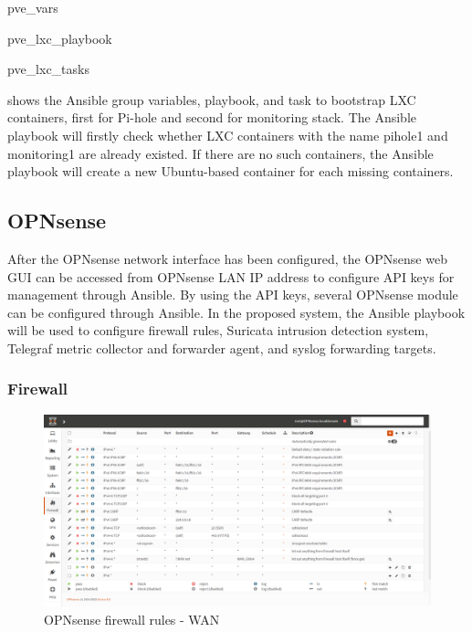 \documentclass[../index.tex]{subfiles}
\begin{document}
{pve_vars}

{pve_lxc_playbook}

{pve_lxc_tasks}

 shows the Ansible group variables,
playbook, and task to bootstrap LXC containers, first for Pi-hole and second for monitoring stack.
The Ansible playbook will firstly check whether LXC containers with the name pihole1 and monitoring1
are already existed. If there are no such containers, the Ansible playbook will create a new
Ubuntu-based container for each missing containers.

\subsection{OPNsense}

After the OPNsense network interface has been configured, the OPNsense web GUI can be accessed from
OPNsense LAN IP address to configure API keys for management through Ansible. By using the API keys,
several OPNsense module can be configured through Ansible. In the proposed system, the Ansible
playbook will be used to configure firewall rules, Suricata intrusion detection system, Telegraf
metric collector and forwarder agent, and syslog forwarding targets. 

\subsubsection{Firewall}

\begin{figure}[h]
  \includegraphics[width=\textwidth]{../assets/opnsense_firewall_rule_2.png}
  \caption{OPNsense firewall rules - WAN}
  \label{fig:opnsense_rule}
\end{figure}
\end{document}
